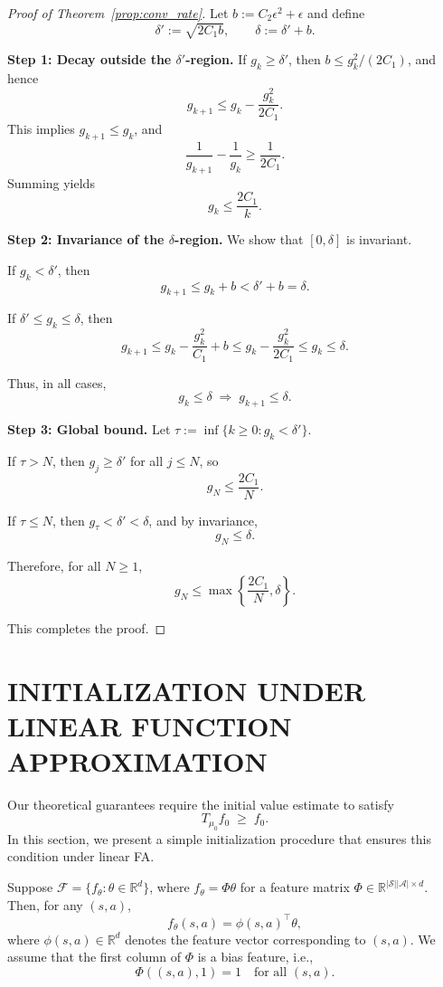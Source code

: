 \documentclass[twoside]{article}
\theoremstyle{plain}
\theoremstyle{definition}
\theoremstyle{remark}
\begin{document}
\begin{proof}[Proof of Theorem~\ref{prop:conv_rate}]
\vspace{0.5em}

Let $b := C_2 \epsilon^2 + \epsilon$ and define
\[
\delta' := \sqrt{2C_1 b}, 
\qquad 
\delta := \delta' + b.
\]

\textbf{Step 1: Decay outside the $\delta'$-region.}
If $g_k \ge \delta'$, then $b \le g_k^2/(2C_1)$, and hence
\[
g_{k+1} \le g_k - \frac{g_k^2}{2C_1}.
\]
This implies $g_{k+1} \le g_k$, and
\[
\frac{1}{g_{k+1}} - \frac{1}{g_k} 
\ge \frac{1}{2C_1}.
\]
Summing yields
\[
g_k \le \frac{2C_1}{k}.
\]

\textbf{Step 2: Invariance of the $\delta$-region.}
We show that $[0,\delta]$ is invariant.

If $g_k < \delta'$, then
\[
g_{k+1} \le g_k + b < \delta' + b = \delta.
\]

If $\delta' \le g_k \le \delta$, then
\[
g_{k+1} \le g_k - \frac{g_k^2}{C_1} + b
\le g_k - \frac{g_k^2}{2C_1}
\le g_k \le \delta.
\]

Thus, in all cases,
\[
g_k \le \delta \;\Rightarrow\; g_{k+1} \le \delta.
\]

\textbf{Step 3: Global bound.}
Let $\tau := \inf\{k \ge 0 : g_k < \delta'\}$.

If $\tau > N$, then $g_j \ge \delta'$ for all $j \le N$, so
\[
g_N \le \frac{2C_1}{N}.
\]

If $\tau \le N$, then $g_\tau < \delta' < \delta$, and by invariance,
\[
g_N \le \delta.
\]

Therefore, for all $N \ge 1$,
\[
g_N \le \max\left\{\frac{2C_1}{N}, \delta\right\}.
\]

This completes the proof.
\end{proof}

\section{INITIALIZATION UNDER LINEAR FUNCTION APPROXIMATION}
\label{sec:init_linear_fa}

Our theoretical guarantees require the initial value estimate to satisfy
\[
T_{\mu_0} f_0 \;\ge\; f_0.
\]
In this section, we present a simple initialization procedure that ensures this condition under linear FA.

Suppose $\mathcal{F} = \{f_\theta : \theta \in \mathbb{R}^d\}$, where $f_\theta = \Phi \theta$ for a feature matrix $\Phi \in \mathbb{R}^{|\mathcal{S}||\mathcal{A}| \times d}$. Then, for any $(s,a)$,
\[
f_\theta(s,a) = \phi(s,a)^\top \theta,
\]
where $\phi(s,a) \in \mathbb{R}^d$ denotes the feature vector corresponding to $(s,a)$. We assume that the first column of $\Phi$ is a bias feature, i.e.,
\[
\Phi((s,a),1) = 1 \quad \text{for all } (s,a).
\]
\end{document}
